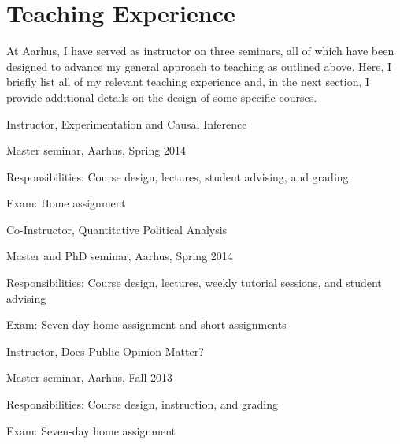 \documentclass[12pt]{article}
\begin{document}
\clearpage

\section{Teaching Experience}

At Aarhus, I have served as instructor on three seminars, all of which have been designed to advance my general approach to teaching as outlined above. Here, I briefly list all of my relevant teaching experience and, in the next section, I provide additional details on the design of some specific courses.

\begin{itemize*}
\item Instructor, Experimentation and Causal Inference
	\begin{itemize*}
	\item Master seminar, Aarhus, Spring 2014
	\item Responsibilities: Course design, lectures, student advising, and grading
	\item Exam: Home assignment
	\end{itemize*}
\item Co-Instructor, Quantitative Political Analysis
	\begin{itemize*}
	\item Master and PhD seminar, Aarhus, Spring 2014
	\item Responsibilities: Course design, lectures, weekly tutorial sessions, and student advising
	\item Exam: Seven-day home assignment and short assignments
	\end{itemize*}
\item Instructor, Does Public Opinion Matter?
	\begin{itemize*}
	\item Master seminar, Aarhus, Fall 2013
	\item Responsibilities: Course design, instruction, and grading
	\item Exam: Seven-day home assignment
	\end{itemize*}

\end{itemize*}
\end{document}
